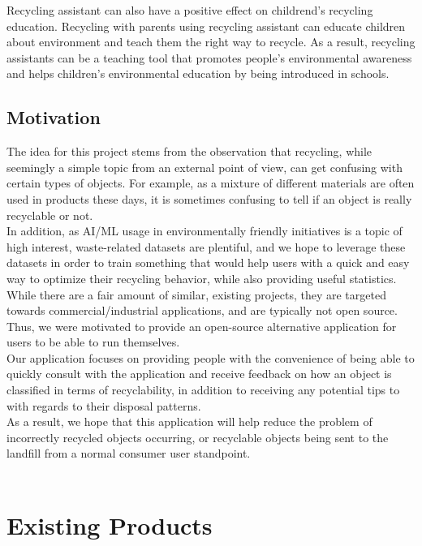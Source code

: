 \documentclass[conference]{IEEEtran}
\begin{document}
Recycling assistant can also have a positive effect on childrend's recycling education. Recycling with parents using recycling assistant can educate children about environment and teach them the right way to recycle. As a result, recycling assistants can be a teaching tool that promotes people's environmental awareness and helps children's environmental education by being introduced in schools.

\subsection{Motivation}

The idea for this project stems from the observation that recycling, while seemingly a simple topic from an external point of view, can get confusing with certain types of objects. For example, as a mixture of different materials are often used in products these days, it is sometimes confusing to tell if an object is really recyclable or not. \\
In addition, as AI/ML usage in environmentally friendly initiatives is a topic of high interest, waste-related datasets are plentiful, and we hope to leverage these datasets in order to train something that would help users with a quick and easy way to optimize their recycling behavior, while also providing useful statistics.\\

While there are a fair amount of similar, existing projects, they are targeted towards commercial/industrial applications, and are typically not open source. Thus, we were motivated to provide an open-source alternative application for users to be able to run themselves.\\

Our application focuses on providing people with the convenience of being able to quickly consult with the application and receive feedback on how an object is classified in terms of recyclability, in addition to receiving any potential tips to with regards to their disposal patterns. \\
As a result, we hope that this application will help reduce the problem of incorrectly recycled objects occurring, or recyclable objects being sent to the landfill from a normal consumer user standpoint. \\~\\

\section{Existing Products}
\end{document}
